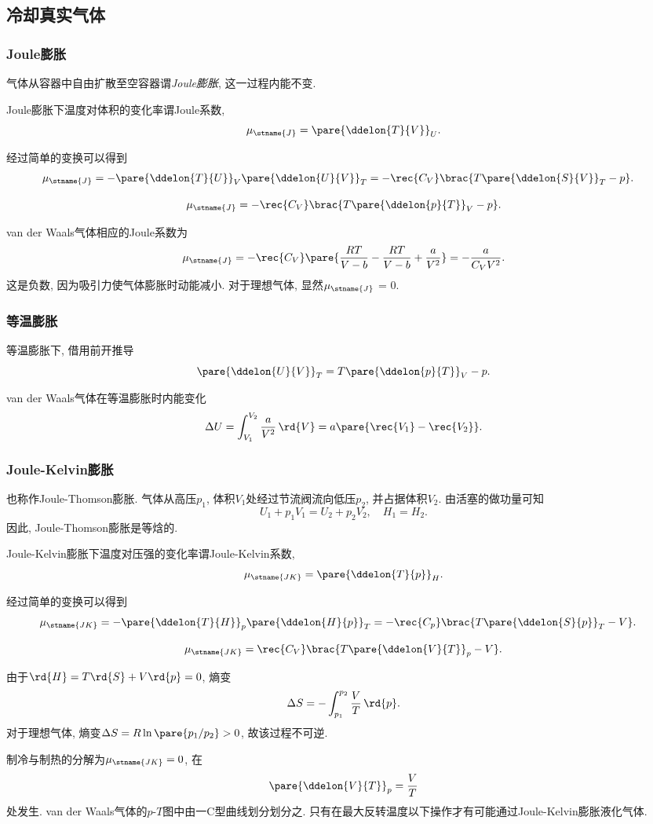 \documentclass[../Thermal.tex]{subfiles}
\begin{document}
\subsection{冷却真实气体}
\subsubsection{Joule膨胀}
气体从容器中自由扩散至空容器谓\emph{Joule膨胀}, 这一过程内能不变.
\begin{definition}[Joule系数]
Joule膨胀下温度对体积的变化率谓Joule系数,
\[ \mu_\stname{J} = \pare{\ddelon{T}{V}}_U. \]
\end{definition}
经过简单的变换可以得到
\begin{align*}
\mu_\stname{J} &= -\pare{\ddelon{T}{U}}_V\pare{\ddelon{U}{V}}_T = -\rec{C_V}\brac{T\pare{\ddelon{S}{V}}_T - p}.
\end{align*}
\begin{finale}
\[ \mu_\stname{J} = -\rec{C_V}\brac{T\pare{\ddelon{p}{T}}_V - p}. \]
\end{finale}
\begin{ex}
van der Waals气体相应的Joule系数为
\[ \mu_\stname{J} = -\rec{C_V}\pare{\frac{RT}{V-b} - \frac{RT}{V-b} + \frac{a}{V^2}} = -\frac{a}{C_V V^2}. \]
这是负数, 因为吸引力使气体膨胀时动能减小. 对于理想气体, 显然$\mu_\stname{J}$ = 0.
\end{ex}
\subsubsection{等温膨胀}
等温膨胀下, 借用前开推导
\[ \pare{\ddelon{U}{V}}_T = T\pare{\ddelon{p}{T}}_V - p. \]
\begin{ex}
van der Waals气体在等温膨胀时内能变化
\[ \Delta U = \int_{V_1}^{V_2} \frac{a}{V^2}\,\rd{V} = a\pare{\rec{V_1} - \rec{V_2}}. \]
\end{ex}
\subsubsection{Joule-Kelvin膨胀}
也称作Joule-Thomson膨胀. 气体从高压$p_1$, 体积$V_1$处经过节流阀流向低压$p_2$, 并占据体积$V_2$. 由活塞的做功量可知
\[ U_1 + p_1 V_1 = U_2 + p_2 V_2,\quad H_1 = H_2. \]
因此, Joule-Thomson膨胀是等焓的.
\begin{definition}
Joule-Kelvin膨胀下温度对压强的变化率谓Joule-Kelvin系数,
\[ \mu_\stname{JK} = \pare{\ddelon{T}{p}}_H. \]
\end{definition}
经过简单的变换可以得到
\begin{align*}
\mu_\stname{JK} &= -\pare{\ddelon{T}{H}}_p\pare{\ddelon{H}{p}}_T = -\rec{C_p}\brac{T\pare{\ddelon{S}{p}}_T - V}.
\end{align*}
\begin{finale}
\[ \mu_\stname{JK} = \rec{C_V}\brac{T\pare{\ddelon{V}{T}}_p - V}. \]
\end{finale}
由于$\rd{H} = T\rd{S} + V\rd{p} = 0$, 熵变
\[ \Delta S = -\int_{p_1}^{p_2}\frac{V}{T}\,\rd{p}. \]
对于理想气体, 熵变$\Delta S = R\ln\pare{p_1/p_2}>0$, 故该过程不可逆.
\par
制冷与制热的分解为$\mu_\stname{JK}=0$, 在
\[ \pare{\ddelon{V}{T}}_p = \frac{V}{T} \]
处发生. van der Waals气体的$p$-$T$图中由一C型曲线划分划分之. 只有在最大反转温度以下操作才有可能通过Joule-Kelvin膨胀液化气体.
\end{document}
